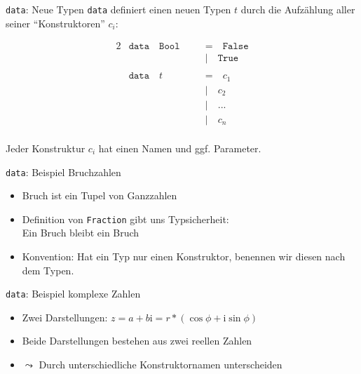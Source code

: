 \documentclass{beamer}
\begin{document}
\begin{frame}{\texttt{data}: Neue Typen}
    \texttt{data} definiert einen neuen Typen $t$ durch die Aufzählung aller seiner \enquote{Konstruktoren} $c_i$:

    \begin{alignat*}{2}
        & \texttt{data} \quad \texttt{Bool} \quad && \texttt{=} \quad \texttt{False} \\
        &               \quad               \quad && \texttt{|} \quad \texttt{True}  \\
        \\
        & \texttt{data} \quad t             \quad && \texttt{=} \quad c_1            \\
        &               \quad               \quad && \texttt{|} \quad c_2            \\
        &               \quad               \quad && \texttt{|} \quad ...            \\
        &               \quad               \quad && \texttt{|} \quad c_n            \\
    \end{alignat*}

    Jeder Konstruktur $c_i$ hat einen Namen und ggf. Parameter.
\end{frame}

\begin{frame}{\texttt{data}: Beispiel Bruchzahlen}

    \begin{itemize}
        \item Bruch ist ein Tupel von Ganzzahlen
        \item Definition von \texttt{Fraction} gibt uns Typsicherheit:\\
              Ein Bruch bleibt ein Bruch
        \item Konvention: Hat ein Typ nur einen Konstruktor, benennen wir diesen nach dem Typen.
    \end{itemize}
\end{frame}

\begin{frame}{\texttt{data}: Beispiel komplexe Zahlen}

    \begin{itemize}
        \item Zwei Darstellungen: $z = a + b\text{i} = r * (\cos \phi + \text{i} \sin \phi)$
        \item Beide Darstellungen bestehen aus zwei reellen Zahlen
        \item $\leadsto$ Durch unterschiedliche Konstruktornamen unterscheiden
    \end{itemize}
\end{frame}
\end{document}
